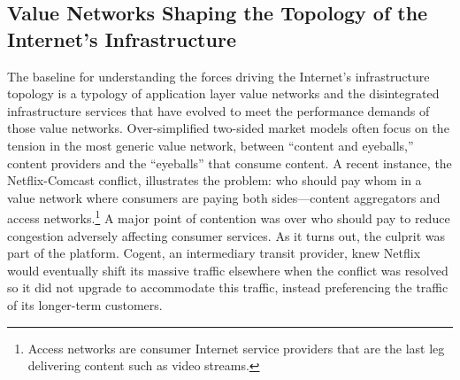\documentclass[12pt,journal,compsoc,letterpaper,onecolumn,twoside]{IEEEtran}
\begin{document}
\subsection{Value Networks Shaping the Topology of the Internet's
  Infrastructure} \label{sec:topology}




The baseline for understanding the forces driving
the Internet's infrastructure topology is a typology of application
layer value networks and the disintegrated infrastructure 
services that have evolved to meet the performance demands of those
value networks.
%
Over-simplified two-sided market models often focus on the tension in
the most generic value network, between
``content and eyeballs,'' content providers and the ``eyeballs'' that
consume content. 
%
A recent instance, the Netflix-Comcast conflict, illustrates the
problem: who should pay whom in a value
network where consumers are paying both sides---content aggregators
and access networks.\footnote{Access networks are consumer Internet
  service providers that are the last leg delivering content such as
  video streams.}
%
A major point of contention was over who should pay to reduce
congestion adversely
affecting consumer services.
%
As it turns out, the culprit was part of the platform.
%
Cogent, an intermediary transit provider, knew Netflix would eventually
shift its massive traffic elsewhere when the conflict was resolved so
it did not upgrade to accommodate this traffic, instead preferencing
the traffic of its longer-term customers. 
%
\end{document}
